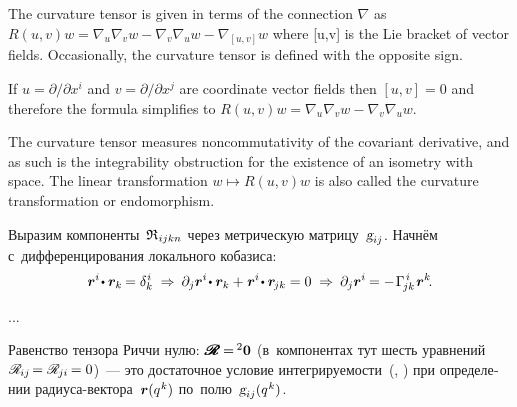 \begin{otherlanguage}{russian}
{\small
The curvature tensor is given in terms of the connection $\nabla$ as
${ R(u,v)w=\nabla_u\nabla_v w - \nabla_v \nabla_u w - \nabla_{[u,v]} w }$
where [u,v] is the Lie bracket of vector fields. Occasionally, the curvature tensor is defined with the opposite sign.

If ${u=\partial /\partial x^{i}}$ and ${v=\partial /\partial x^{j}}$ are coordinate vector fields then ${[u,v]=0}$ and therefore the formula simplifies to ${\displaystyle R(u,v)w=\nabla _{u}\nabla _{v}w-\nabla _{v}\nabla _{u}w}$.

The curvature tensor measures noncommutativity of the covariant derivative, and as such is the integrability obstruction for the existence of an isometry with  space. The linear transformation ${w\mapsto R(u,v)w}$ is also called the curvature transformation or endomorphism.
\par}



Выразим компоненты~${\mathfrak{R}_{\hspace{.1ex}ijkn}}$ через метрическую матрицу~${\textsl{g}_{ij}}$. Начнём с~дифференцирования локального кобазиса:
\[ \bm{r}^i \hspace{-0.32ex} \dotp \bm{r}_k \hspace{-0.16ex} = \delta_k^{\hspace{0.1ex}i} \;\Rightarrow\:
\partial_j \bm{r}^i \hspace{-0.32ex} \dotp \bm{r}_k + \hspace{.1ex} \bm{r}^i \hspace{-0.32ex} \dotp \bm{r}_{\hspace{-0.2ex}jk} = 0 \;\Rightarrow\:
\partial_j \bm{r}^i \hspace{-0.12ex} = - \hspace{.2ex} \Gamma_{\hspace{-0.25ex}jk}^{\hspace{.25ex}i} \hspace{.2ex} \bm{r}^k
\hspace{-0.4ex}. \]

...


Равенство тензора Риччи нулю: ${\hspace{.1ex}\pmb{\scalebox{1.2}[1]{$\mathscr{R}$}} \hspace{-0.16ex} = \hspace{-0.2ex} {^2\bm{0}}}$ (в~компонентах тут шесть уравнений ${\hspace{.1ex}\mathscr{R}_{\hspace{-0.1ex}ij} \hspace{-0.3ex} = \mathscr{R}_{\hspace{-0.1ex}ji} \hspace{-0.2ex} = 0}$)~--- это достаточное условие %
интегрируемости~(, ) при определении радиуса-вектора~${\bm{r}(q^{\hspace{.1ex}k})}$ по~полю~${\textsl{g}_{ij}(q^{\hspace{.1ex}k})}$.

\end{otherlanguage}

